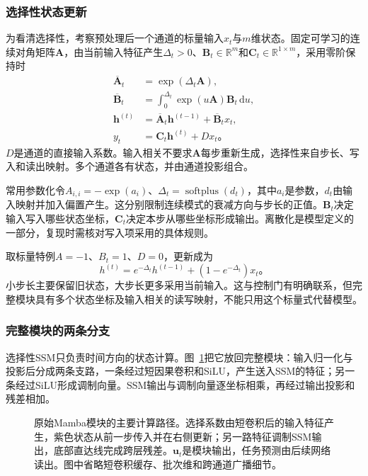 \subsubsection{选择性状态更新}
\label{sec:rnn-mamba-selection}

为看清选择性，考察预处理后一个通道的标量输入$x_t$与$m$维状态。固定可学习的连续对角矩阵$\bm A$，由当前输入特征产生$\Delta_t>0$、$\bm B_t\in\mathbb R^m$和$\bm C_t\in\mathbb R^{1\times m}$，采用零阶保持时
\begin{equation}
  \begin{aligned}
    \overline{\bm A}_t&=\exp(\Delta_t\bm A),\\
    \overline{\bm B}_t&=\int_0^{\Delta_t}\exp(u\bm A)\bm B_t\,\mathrm du,\\
    \bm h^{(t)}&=\overline{\bm A}_t\bm h^{(t-1)}+\overline{\bm B}_t x_t,\\
    y_t&=\bm C_t\bm h^{(t)}+D x_t\text{。}
  \end{aligned}
  \label{eq:rnn-mamba-selection}
\end{equation}
$D$是通道的直接输入系数。输入相关不要求$\bm A$每步重新生成，选择性来自步长、写入和读出映射。多个通道各有状态，并由通道投影组合。

常用参数化令$A_{i,i}=-\exp(a_i)$、$\Delta_t=\operatorname{softplus}(d_t)$，其中$a_i$是参数，$d_t$由输入映射并加入偏置产生。这分别限制连续模式的衰减方向与步长的正值。$\bm B_t$决定输入写入哪些状态坐标，$\bm C_t$决定本步从哪些坐标形成输出。离散化是模型定义的一部分，复现时需核对写入项采用的具体规则。

取标量特例$A=-1$、$B_t=1$、$D=0$，更新成为
\begin{equation}
  h^{(t)}=e^{-\Delta_t}h^{(t-1)}+(1-e^{-\Delta_t})x_t\text{。}
  \label{eq:rnn-mamba-gate-special-case}
\end{equation}
小步长主要保留旧状态，大步长更多采用当前输入。这与控制门有明确联系，但完整模块具有多个状态坐标及输入相关的读写映射，不能只用这个标量式代替模型。

\subsubsection{完整模块的两条分支}
\label{sec:rnn-mamba-architecture}

选择性SSM只负责时间方向的状态计算。图~\ref{fig:rnn-mamba}把它放回完整模块：输入归一化与投影后分成两条支路，一条经过短因果卷积和SiLU，产生送入SSM的特征；另一条经过SiLU形成调制向量。SSM输出与调制向量逐坐标相乘，再经过输出投影和残差相加。
\begin{figure}[htb]
  \centering
  
  \caption{原始Mamba模块的主要计算路径。选择系数由短卷积后的输入特征产生，紫色状态从前一步传入并在右侧更新；另一路特征调制SSM输出，底部直达线完成跨层残差。$\bm u_t$是模块输出，任务预测由后续网络读出。图中省略短卷积缓存、批次维和跨通道广播细节。}
  \label{fig:rnn-mamba}
\end{figure}

